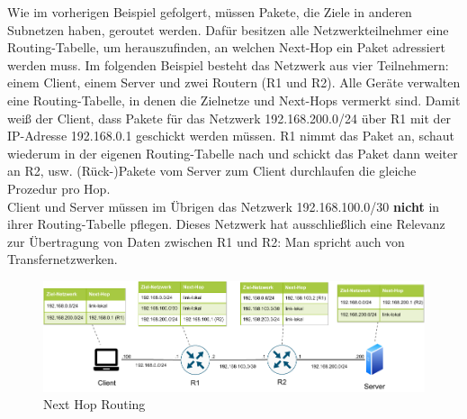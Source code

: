 Wie im vorherigen Beispiel gefolgert, müssen Pakete, die Ziele in anderen Subnetzen haben, geroutet werden. Dafür besitzen alle Netzwerkteilnehmer eine Routing-Tabelle, um herauszufinden, an welchen \glqq Next-Hop\grqq{} ein Paket adressiert werden muss. Im folgenden Beispiel besteht das Netzwerk aus vier Teilnehmern: einem Client, einem Server und zwei Routern (R1 und R2). Alle Geräte verwalten eine Routing-Tabelle, in denen die Zielnetze und Next-Hops vermerkt sind.
Damit weiß der Client, dass Pakete für das Netzwerk 192.168.200.0/24 über R1 mit der IP-Adresse 192.168.0.1 geschickt werden müssen. R1 nimmt das Paket an, schaut wiederum in der eigenen Routing-Tabelle nach und schickt das Paket dann weiter an R2, usw. (Rück-)Pakete vom Server zum Client durchlaufen die gleiche Prozedur pro Hop.\\
Client und Server müssen im Übrigen das Netzwerk 192.168.100.0/30 \textbf{nicht} in ihrer Routing-Tabelle pflegen. Dieses Netzwerk hat ausschließlich eine Relevanz zur Übertragung von Daten zwischen R1 und R2: Man spricht auch von Transfernetzwerken.\\

\begin{figure}[h]
  \centering
  \includegraphics{Figures/next_hop_routing_specific_table.pdf}
  \caption{Next Hop Routing}
  \label{grafik: next_hop_routing}
\end{figure}

